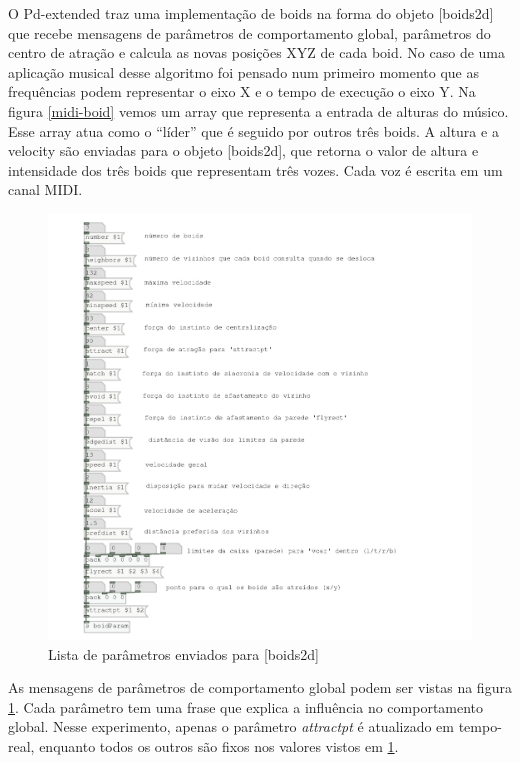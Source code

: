 \documentclass[draft]{ppgmus}
\begin{document}
O Pd-extended traz uma implementação de boids na forma do objeto [boids2d] que recebe mensagens de parâmetros
de comportamento global, parâmetros do centro de atração e calcula as novas posições XYZ de cada
boid. No caso de uma aplicação musical desse algoritmo foi pensado num primeiro momento que as frequências
podem representar o eixo X e o tempo de execução o eixo Y. 
Na figura \ref{midi-boid} vemos um array que representa a entrada de alturas do músico. Esse array atua como
o ``líder'' que é seguido por outros três boids. A altura e a velocity são enviadas para o objeto [boids2d],
que retorna o valor de altura e intensidade dos três boids que representam três vozes. Cada voz é escrita
em um canal MIDI.


\begin{figure}
\includegraphics[scale=.6]{boids-param}
\caption{Lista de parâmetros enviados para [boids2d]}
\label{boids-param}
\end{figure} 

As mensagens de parâmetros de comportamento global podem ser vistas na figura \ref{boids-param}. 
Cada parâmetro tem uma frase que explica a influência no comportamento global. Nesse experimento,
apenas o parâmetro \textit{attractpt} é atualizado em tempo-real, enquanto todos os outros são
fixos nos valores vistos em \ref{boids-param}.
\end{document}

